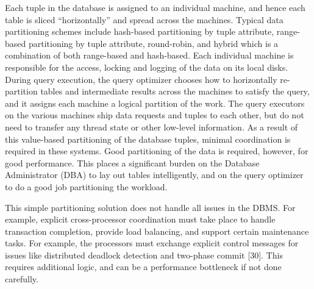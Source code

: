 \documentclass[b5paper,11pt,twoside,openright]{book}
\begin{document}
Each tuple in the database is assigned to an individual machine, and
hence each table is sliced ``horizontally'' and spread across the
machines. Typical data partitioning schemes include hash-based
partitioning by tuple attribute, range-based partitioning by tuple
attribute, round-robin, and hybrid which is a combination of both
range-based and hash-based. Each individual machine is responsible for
the access, locking and logging of the data on its local disks. During
query execution, the query optimizer chooses how to horizontally
re-partition tables and intermediate results across the machines to
satisfy the query, and it assigns each machine a logical partition of
the work. The query executors on the various machines ship data requests
and tuples to each other, but do not need to transfer any thread state
or other low-level information. As a result of this value-based
partitioning of the database tuples, minimal coordination is required in
these systems. Good partitioning of the data is required, however, for
good performance. This places a significant burden on the Database
Administrator (DBA) to lay out tables intelligently, and on the query
optimizer to do a good job partitioning the workload.

This simple partitioning solution does not handle all issues in the
DBMS. For example, explicit cross-processor coordination must take place
to handle transaction completion, provide load balancing, and support
certain maintenance tasks. For example, the processors must exchange
explicit control messages for issues like distributed deadlock detection
and two-phase commit {[}30{]}. This requires additional logic, and can
be a performance bottleneck if not done carefully.
\end{document}
